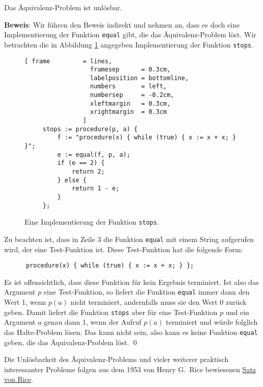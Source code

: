 \begin{Theorem}[Rice, 1953]
Das Äquivalenz-Problem ist unlösbar.  
\end{Theorem}

\noindent
\textbf{Beweis}:
Wir führen den Beweis indirekt und nehmen
an, dass es doch eine Implementierung der Funktion \texttt{equal} gibt, die das
Äquivalenz-Problem löst.  Wir betrachten die in Abbildung 
\ref{fig:stops} angegeben Implementierung der Funktion \texttt{stops}.


\begin{figure}[!h]
  \centering
\begin{Verbatim}[ frame         = lines, 
                  framesep      = 0.3cm, 
                  labelposition = bottomline,
                  numbers       = left,
                  numbersep     = -0.2cm,
                  xleftmargin   = 0.3cm,
                  xrightmargin  = 0.3cm
                ]
     stops := procedure(p, a) {
         f := "procedure(x) { while (true) { x := x + x; } }"; 
         e := equal(f, p, a);
         if (e == 2) {
             return 2;
         } else {
             return 1 - e;
         }
     };
\end{Verbatim}
  \vspace*{-0.3cm}
  \caption{Eine Implementierung der Funktion \texttt{stops}.}
  \label{fig:stops}
\end{figure}

Zu beachten ist, dass in Zeile 3 die Funktion \texttt{equal} mit einem String aufgerufen
wird, der eine Test-Funktion ist.  Diese 
Test-Funktion hat die
folgende Form:
\begin{verbatim}
      procedure(x) { while (true) { x := x + x; } };
\end{verbatim}
Es ist offensichtlich, dass diese Funktion für kein Ergebnis terminiert.
Ist also das Argument $p$ eine Test-Funktion, so liefert die Funktion
\texttt{equal} immer dann den Wert 1, 
wenn $p(a)$ nicht terminiert, andernfalls muss sie den Wert 0 zurück geben.
Damit liefert die Funktion \texttt{stops} aber für eine Test-Funktion $p$ 
und ein Argument 
$a$ genau dann 1, wenn der Aufruf $p(a)$ terminiert und würde folglich das Halte-Problem
lösen.  Das kann nicht sein, also kann es keine Funktion  \texttt{equal}
geben, die das Äquivalenz-Problem löst. 
\qed
\vspace*{0.3cm}

\noindent
Die Unlösbarkeit des Äquivalenz-Problems und vieler weiterer praktisch interessanter
Probleme folgen aus dem 1953 von Henry G.~Rice \cite{rice:53} bewiesenen
\href{http://de.wikipedia.org/wiki/Satz_von_Rice}{Satz von Rice}.


